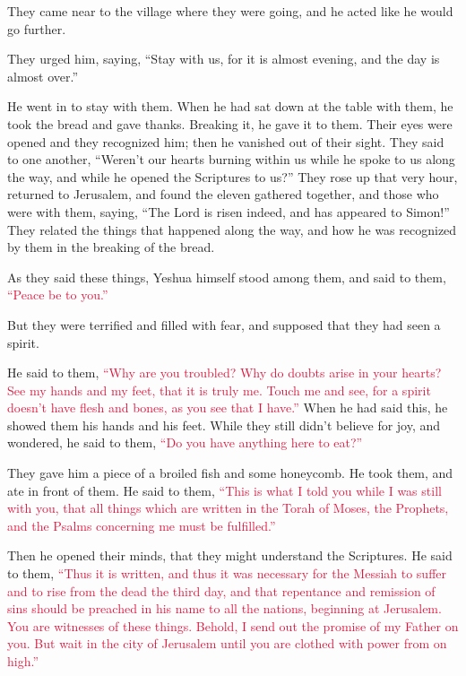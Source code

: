 \myverse{}They came near to the village where they were going, and he
acted like he would go further.

\myverse{}They urged him, saying, “Stay with us, for it is almost evening,
and the day is almost over.”

He went in to stay with them.
\myverse{}When he had sat down at the table with them, he took the bread and gave thanks.
Breaking it, he gave it to them.
\myverse{}Their eyes were opened and they recognized him; then he vanished out of their
sight.
\myverse{}They said to one another, “Weren’t our hearts burning within us while he
spoke to us along the way, and while he opened the Scriptures to us?”
\myverse{}They rose up that very hour, returned to Jerusalem, and found the eleven
gathered together, and those who were with them,
\myverse{}saying, “The Lord is risen indeed, and has appeared to Simon!”
\myverse{}They related the things that happened along the way, and how he was recognized
by them in the breaking of the bread.

\myverse{}As they said these things, Yeshua himself stood among them,
and said to them,
\textcolor{crimson}{“Peace be to you.”}

\myverse{}But they were terrified and filled with fear, and supposed that
they had seen a spirit.

\myverse{}He said to them,
\textcolor{crimson}{“Why are you troubled? Why do doubts arise in your hearts?
}
\myverse{}\textcolor{crimson}{See my hands and my feet, that it is truly me. Touch me and see, for
	a spirit doesn’t have flesh and bones, as you see that I have.”}
\myverse{}When he had said this, he showed them his hands and his feet.
\myverse{}While they still didn’t believe for joy, and wondered, he said to them,
\textcolor{crimson}{“Do you have anything here to eat?”}

\myverse{}They gave him a piece of a broiled fish and some honeycomb.
\myverse{}He took them, and ate in front of them.
\myverse{}He said to them,
\textcolor{crimson}{“This is what I told you while I was still with you, that all things which are written in the Torah
	of Moses, the Prophets, and the Psalms concerning me must be fulfilled.”}

\myverse{}Then he opened their minds, that they might understand the Scriptures.
\myverse{}He said to them,
\textcolor{crimson}{“Thus it is written, and thus it was necessary for the Messiah to suffer and to rise from the dead
	the third day,
}
\myverse{}\textcolor{crimson}{and that repentance and remission of sins should be preached in his name
	to all the nations, beginning at Jerusalem.
}
\myverse{}\textcolor{crimson}{You are witnesses of these things.
}
\myverse{}\textcolor{crimson}{Behold, I send out the promise of my Father on you. But wait in the city
	of Jerusalem until you are clothed with power from on high.”
}

